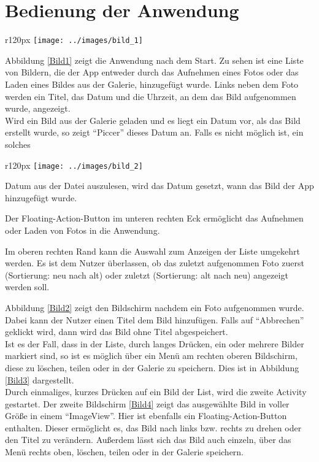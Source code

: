 
\chapter{Bedienung der Anwendung}
\begin{wrapfigure}{r}{120px}
\label{Bild1}
\centering
\texttt{[image: ../images/bild\_1]}
\caption{Übersicht}
\end{wrapfigure}
Abbildung \ref{Bild1} zeigt die Anwendung nach dem Start. Zu sehen ist eine Liste von Bildern, die der App entweder durch das Aufnehmen eines Fotos oder das Laden eines Bildes
aus der Galerie, hinzugefügt wurde. Links neben dem Foto werden ein Titel, das Datum und die Uhrzeit, an dem das Bild aufgenommen wurde, angezeigt. \\
Wird ein Bild aus der Galerie geladen und es liegt ein Datum vor, als das Bild erstellt wurde, so zeigt \enquote{Piccer} dieses Datum an. Falls es nicht möglich ist, ein solches
\begin{wrapfigure}{r}{120px}
\label{Bild2}
\centering
\texttt{[image: ../images/bild\_2]}
\caption{Titel vergeben}
\end{wrapfigure}
Datum aus der Datei auszulesen, wird das Datum gesetzt, wann das Bild der App hinzugefügt wurde.

Der Floating-Action-Button im unteren rechten Eck ermöglicht das Aufnehmen oder Laden von Fotos in die Anwendung.

Im oberen rechten Rand kann die Auswahl zum Anzeigen der Liste umgekehrt werden. Es ist dem Nutzer überlassen, ob das zuletzt aufgenommen Foto zuerst (Sortierung: neu nach alt) oder zuletzt (Sortierung: alt nach neu) angezeigt werden soll.


Abbildung \ref{Bild2} zeigt den Bildschirm nachdem ein Foto aufgenommen wurde.
Dabei kann der Nutzer einen Titel dem Bild hinzufügen. Falls auf \enquote{Abbrechen}
 geklickt wird, dann wird das Bild ohne Titel abgespeichert.\\

Ist es der Fall, dass in der Liste, durch langes Drücken, ein oder mehrere Bilder markiert sind, so ist es möglich über ein Menü am rechten oberen Bildschirm, diese zu löschen, teilen oder in der Galerie zu speichern. Dies ist in Abbildung \ref{Bild3} dargestellt.\\

Durch einmaliges, kurzes Drücken auf ein Bild der List, wird die zweite Activity
gestartet. Der zweite Bildschirm \ref{Bild4} zeigt das ausgewählte Bild in voller Größe in einem \enquote{ImageView}. Hier ist ebenfalls ein Floating-Action-Button enthalten. Dieser ermöglicht es, das Bild nach links bzw. rechts zu drehen oder den Titel zu verändern.
Außerdem lässt sich das Bild auch einzeln, über das Menü rechts oben, löschen, teilen oder in der Galerie speichern.

